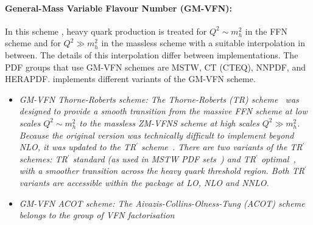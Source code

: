 \paragraph{General-Mass Variable Flavour Number (GM-VFN)\rm:\\}
In this scheme \cite{VFN}, heavy quark production is treated for
$Q^2 \sim m_h^2$ in the FFN scheme and for $Q^2 \gg m_h^2$
in the massless scheme with a suitable interpolation in between. 
The details of this interpolation differ between implementations.
The PDF groups that use GM-VFN schemes are MSTW, CT (CTEQ), NNPDF, and HERAPDF.
\fitter implements different variants of the GM-VFN scheme.
% 
\begin{itemize}
%
\item \it {GM-VFN Thorne-Roberts scheme:} \rm
%
%
The Thorne-Roberts (TR) scheme~\cite{Thorne:1997ga} was designed to provide a smooth transition 
from the massive FFN scheme at low scales $Q^2 \sim m_h^2$ to the massless ZM-VFNS scheme at high scales $Q^2 \gg m_h^2$. 
Because the original version was technically difficult to implement beyond NLO, it was updated 
to the TR$^\prime$ scheme~\cite{Thorne:2006qt}.
There are two variants of the TR$^\prime$ schemes: TR$^\prime$ standard (as used in MSTW PDF sets~\cite{Thorne:2006qt,MSTWpdf}) 
and TR$^\prime$ optimal~\cite{Thorne:6180}, with a smoother transition across the heavy quark threshold region. 
Both TR$^\prime$ variants are accessible within the \fitter package at LO, NLO and NNLO.
\vspace{0.1cm}
\item \it {GM-VFN ACOT scheme:} \rm
The Aivazis-Collins-Olness-Tung (ACOT) scheme belongs to the group of VFN factorisation 

\end{itemize}
